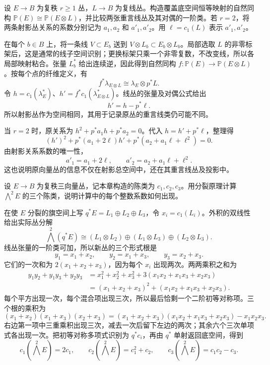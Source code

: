\begin{exercise}\label{g2:ex:projectivization-line-twist}
	设 \(E\to B\) 为复秩 \(r\ge1\) 丛，\(L\to B\) 为复线丛。构造覆盖底空间恒等映射的自然同构 \(\mathbb P(E)\cong\mathbb P(E\otimes L)\)，并比较两张重言线丛及其对偶的一阶类。若 \(r=2\)，将两条射影丛关系的系数分别记为 \(a_1,a_2\) 和 \(a'_1,a'_2\)。用 \(\ell=c_1(L)\) 表示 \(a'_1,a'_2\)。
\end{exercise}
\begin{solution}
	在每个 \(b\in B\) 上，将一条线 \(V\subset E_b\) 送到 \(V\otimes L_b\subset E_b\otimes L_b\)。局部选取 \(L\) 的非零标架后，这是通常的线子空间识别；更换标架只乘一个非零复数，不改变线，所以各局部映射粘合。张量 \(L_b^*\) 给出连续逆，因此得到自然同构 \(f:\mathbb P(E)\to\mathbb P(E\otimes L)\)。按每个点的纤维定义，有
	\[
		f^*\lambda_{E\otimes L}\cong\lambda_E\otimes p^*L.
	\]
	令 \(h=c_1(\lambda_E^*)\)、\(h'=f^*c_1(\lambda_{E\otimes L}^*)\)。线丛的张量及对偶公式给出
	\[
		h'=h-p^*\ell.
	\]
	所以射影丛作为空间相同，其用于记录原丛的重言线类仍可能不同。

	当 \(r=2\) 时，原关系为 \(h^2+p^*a_1h+p^*a_2=0\)。代入 \(h=h'+p^*\ell\)，整理得
	\[
		(h')^2+p^*(a_1+2\ell)h'+p^*(a_2+a_1\ell+\ell^2)=0.
	\]
	由射影关系系数的唯一性，
	\[
		a'_1=a_1+2\ell,\qquad a'_2=a_2+a_1\ell+\ell^2.
	\]
	这也说明原向量丛的信息不仅在射影总空间中，还在其重言线丛及投影中。
\end{solution}

\begin{exercise}\label{g2:ex:exterior-square-rank-three-roots}
	设 \(E\to B\) 为复秩三向量丛，记本章构造的陈类为 \(c_1,c_2,c_3\)。用分裂原理计算 \(\bigwedge^2E\) 的三个陈类，说明计算中的每个整数系数如何出现。
\end{exercise}
\begin{solution}
	在使 \(E\) 分裂的旗空间上写 \(q^*E=L_1\oplus L_2\oplus L_3\)，令 \(x_i=c_1(L_i)\)。外积的双线性给出实际丛分解
	\[
		\bigwedge^2(q^*E)\cong(L_1\otimes L_2)\oplus(L_1\otimes L_3)\oplus(L_2\otimes L_3).
	\]
	线丛张量的一阶类可加，所以新丛的三个形式根是
	\[
		y_1=x_1+x_2,\qquad y_2=x_1+x_3,\qquad y_3=x_2+x_3.
	\]
	它们的一次和为 \(2(x_1+x_2+x_3)\)，因为每个 \(x_i\) 出现两次。两两乘积之和为
	\[
	\begin{aligned}
		y_1y_2+y_1y_3+y_2y_3
		&=x_1^2+x_2^2+x_3^2+3(x_1x_2+x_1x_3+x_2x_3)\\
		&=(x_1+x_2+x_3)^2+(x_1x_2+x_1x_3+x_2x_3).
	\end{aligned}
	\]
	每个平方出现一次，每个混合项出现三次，所以最后恰剩一个二阶初等对称项。三个根的乘积为
	\[
		(x_1+x_2)(x_1+x_3)(x_2+x_3)
		=(x_1+x_2+x_3)(x_1x_2+x_1x_3+x_2x_3)-x_1x_2x_3.
	\]
	右边第一项中三重乘积出现三次，减去一次后留下左边的两次；其余六个三次单项式各出现一次。把初等对称多项式识别为 \(q^*c_i\)，再由 \(q^*\) 单射返回底空间，得到
	\[
		c_1\!\left(\bigwedge^2E\right)=2c_1,\qquad
		c_2\!\left(\bigwedge^2E\right)=c_1^2+c_2,\qquad
		c_3\!\left(\bigwedge^2E\right)=c_1c_2-c_3.
	\]
\end{solution}

